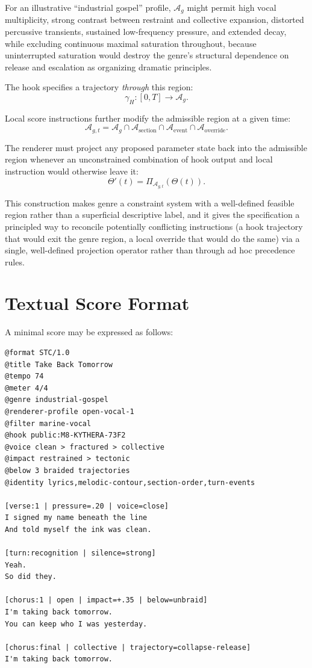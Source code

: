\documentclass[11pt]{article}
\begin{document}
For an illustrative ``industrial gospel'' profile, $\mathcal{A}_g$ might permit high vocal multiplicity, strong contrast between restraint and collective expansion, distorted percussive transients, sustained low-frequency pressure, and extended decay, while excluding continuous maximal saturation throughout, because uninterrupted saturation would destroy the genre's structural dependence on release and escalation as organizing dramatic principles.

The hook specifies a trajectory \emph{through} this region:
\[
\gamma_H:[0,T]\rightarrow\mathcal{A}_g.
\]

Local score instructions further modify the admissible region at a given time:
\[
\mathcal{A}_{g,t}
=
\mathcal{A}_g
\cap
\mathcal{A}_{\mathrm{section}}
\cap
\mathcal{A}_{\mathrm{event}}
\cap
\mathcal{A}_{\mathrm{override}}.
\]

The renderer must project any proposed parameter state back into the admissible region whenever an unconstrained combination of hook output and local instruction would otherwise leave it:
\[
\Theta'(t)
=
\Pi_{\mathcal{A}_{g,t}}
\left(
\Theta(t)
\right).
\]

This construction makes genre a constraint system with a well-defined feasible region rather than a superficial descriptive label, and it gives the specification a principled way to reconcile potentially conflicting instructions (a hook trajectory that would exit the genre region, a local override that would do the same) via a single, well-defined projection operator rather than through ad hoc precedence rules.

\section{Textual Score Format}

A minimal score may be expressed as follows:

\begin{Verbatim}[frame=single,fontsize=\small]
@format STC/1.0
@title Take Back Tomorrow
@tempo 74
@meter 4/4
@genre industrial-gospel
@renderer-profile open-vocal-1
@filter marine-vocal
@hook public:M8-KYTHERA-73F2
@voice clean > fractured > collective
@impact restrained > tectonic
@below 3 braided trajectories
@identity lyrics,melodic-contour,section-order,turn-events

[verse:1 | pressure=.20 | voice=close]
I signed my name beneath the line
And told myself the ink was clean.

[turn:recognition | silence=strong]
Yeah.
So did they.

[chorus:1 | open | impact=+.35 | below=unbraid]
I'm taking back tomorrow.
You can keep who I was yesterday.

[chorus:final | collective | trajectory=collapse-release]
I'm taking back tomorrow.
\end{Verbatim}
\end{document}
